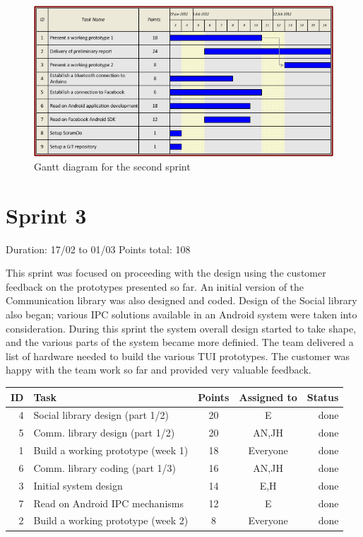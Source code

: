 \begin{figure}[h!]
\centering \includegraphics[scale=0.8]{img/sprints-gantt2.png}
\caption{Gantt diagram for the second sprint}
\label{fig:sprints-gantt2}
\end{figure}

\newpage

\section{Sprint 3}

Duration: 17/02 to 01/03\newline
Points total: 108

This sprint was focused on proceeding with the design using the customer
feedback on the prototypes presented so far. An initial version of the
Communication library was also designed and coded. Design of the Social library
also began; various IPC solutions available in an Android system were taken into
consideration. During this sprint the system overall design started to take
shape, and the various parts of the system became more definied. The team
delivered a list of hardware needed to build the various TUI prototypes.
The customer was happy with the team work so far and provided very valuable
feedback.

\begin{table}[ht!]
\begin{tabular}{ | r | l | c | c | r | }

\hline
\textbf{ID} & \textbf{Task} & \textbf{Points} & \textbf{Assigned to} & \textbf{Status} \\
\hline

 4 & Social library design (part 1/2)				& 20 & E		& done \\
\hline
 5 & Comm. library design (part 1/2)				& 20 & AN,JH	& done \\
\hline
 1 & Build a working prototype (week 1)				& 18 & Everyone & done \\
\hline
 6 & Comm. library coding (part 1/3)				& 16 & AN,JH	& done \\
\hline
 3 & Initial system design							& 14 & E,H		& done \\
\hline
 7 & Read on Android IPC mechanisms					& 12 & E		& done \\
\hline
 2 & Build a working prototype (week 2)				& 8 & Everyone	& done \\
\hline

\end{tabular}
\end{table}

